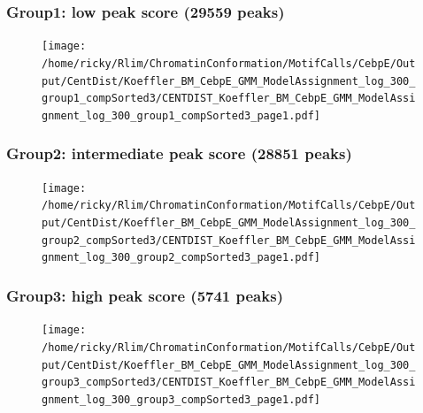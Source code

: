 \documentclass[notes]{beamer}
\begin{document}
\begin{frame}[plain]
    \frametitle{Group1: low peak score (29559 peaks)}
    \begin{figure}
        \texttt{[image: /home/ricky/Rlim/ChromatinConformation/MotifCalls/CebpE/Output/CentDist/Koeffler\_BM\_CebpE\_GMM\_ModelAssignment\_log\_300\_group1\_compSorted3/CENTDIST\_Koeffler\_BM\_CebpE\_GMM\_ModelAssignment\_log\_300\_group1\_compSorted3\_page1.pdf]}
    \end{figure}
\end{frame}

\begin{frame}[plain]
    \frametitle{Group2: intermediate peak score (28851 peaks)}
    \begin{figure}
        \texttt{[image: /home/ricky/Rlim/ChromatinConformation/MotifCalls/CebpE/Output/CentDist/Koeffler\_BM\_CebpE\_GMM\_ModelAssignment\_log\_300\_group2\_compSorted3/CENTDIST\_Koeffler\_BM\_CebpE\_GMM\_ModelAssignment\_log\_300\_group2\_compSorted3\_page1.pdf]}
    \end{figure}
\end{frame}

\begin{frame}[plain]
    \frametitle{Group3: high peak score (5741 peaks)}
    \begin{figure}
        \texttt{[image: /home/ricky/Rlim/ChromatinConformation/MotifCalls/CebpE/Output/CentDist/Koeffler\_BM\_CebpE\_GMM\_ModelAssignment\_log\_300\_group3\_compSorted3/CENTDIST\_Koeffler\_BM\_CebpE\_GMM\_ModelAssignment\_log\_300\_group3\_compSorted3\_page1.pdf]}
    \end{figure}
\end{frame}


\end{document}
